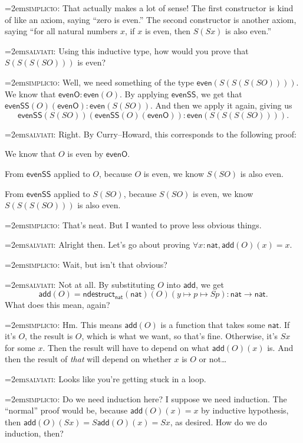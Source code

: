\documentclass[11pt,paper=letter]{scrartcl}
\newcommand{\sf}{\mathsf}
\newcommand{\simp}{\vspace{0.5em}\noindent\hangindent=2em\textsc{simplicio:} }
\newcommand{\salv}{\vspace{0.5em}\noindent\hangindent=2em\textsc{salviati:} }
\begin{document}
\simp That actually makes a lot of sense! The first constructor is kind of like an axiom, saying ``zero is even.'' The second constructor is another axiom, saying ``for all natural numbers $x$, if $x$ is even, then $S(Sx)$ is also even.''

\salv Using this inductive type, how would you prove that $S(S(S(SO)))$ is even?

\simp Well, we need something of the type $\sf{even}(S(S(S(SO))))$. We know that $\sf{evenO} : \sf{even}(O)$. By applying $\sf{evenSS}$, we get that $\sf{evenSS}(O)(\sf{evenO}) : \sf{even}(S(SO))$. And then we apply it again, giving us \[
  \sf{evenSS}(
    S(SO))(
    \sf{evenSS}(O)(\sf{evenO})
  ) : \sf{even}(S(S(S(SO)))).
\]

\salv Right. By Curry--Howard, this corresponds to the following proof:
\begin{itemthin}
\item We know that $O$ is even by $\sf{evenO}$.
\item From $\sf{evenSS}$ applied to $O$, because $O$ is even, we know $S(SO)$ is also even.
\item From $\sf{evenSS}$ applied to $S(SO)$, because $S(SO)$ is even, we know $S(S(S(SO)))$ is also even.
\end{itemthin}

\simp That's neat. But I wanted to prove less obvious things.

\salv Alright then. Let's go about proving $\forall x: \sf{nat}, \sf{add}(O)(x) = x$.

\simp Wait, but isn't that obvious?

\salv Not at all. By substituting $O$ into $\sf{add}$, we get \[
  \sf{add}(O)
  = \sf{ndestruct}_\sf{nat}(\sf{nat})(O)(y \mapsto p \mapsto Sp): \sf{nat} \to \sf{nat}.
\]
What does this mean, again?

\simp Hm. This means $\sf{add}(O)$ is a function that takes some $\sf{nat}$. If it's $O$, the result is $O$, which is what we want, so that's fine. Otherwise, it's $Sx$ for some $x$. Then the result will have to depend on what $\sf{add}(O)(x)$ is. And then the result of \emph{that} will depend on whether $x$ is $O$ or not\dots

\salv Looks like you're getting stuck in a loop.

\simp Do we need induction here? I suppose we need induction. The ``normal'' proof would be, because $\sf{add}(O)(x) = x$ by inductive hypothesis, then $\sf{add}(O)(Sx) = S\sf{add}(O)(x) = Sx$, as desired. How do we do induction, then?
\end{document}

